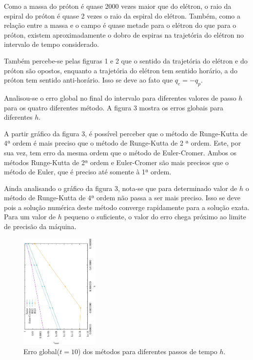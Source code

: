 \documentclass[brazilian, 12pt, a4paper, final]{article}
\begin{document}
\begin{multicols*}{2}
Como a massa do próton é quase 2000 vezes maior que do elétron, o raio da espiral do próton é quase 2 vezes o raio da espiral do elétron. Também, como a relação entre a massa e o campo é quase metade para o elétron do que para o próton, existem aproximadamente o dobro de espiras na trajetória do elétron no intervalo de tempo considerado.

Também percebe-se pelas figuras 1 e 2 que o sentido da trajetória do elétron e do próton são opostos, enquanto a trajetória do elétron tem sentido horário, a do próton tem sentido anti-horário. Isso se deve ao fato que $q_e=-q_p$.

Analisou-se o erro global no final do intervalo para diferentes valores de passo $h$ para os quatro diferentes método. A figura 3 mostra os erros globais para diferentes $h$.

A partir gráfico da figura 3, é possível perceber que o método de Runge-Kutta de 4ª ordem é mais preciso que o método de Runge-Kutta de 2 ª ordem. Este, por sua vez, tem erro da mesma ordem que o método de Euler-Cromer. Ambos os métodos Runge-Kutta de 2ª ordem e Euler-Cromer são mais precisos que o método de Euler, que é preciso até somente à 1ª ordem. 

Ainda analisando o gráfico da figura 3, nota-se que para determinado valor de $h$ o método de Runge-Kutta de 4ª ordem não passa a ser mais preciso. Isso se deve pois a solução numérica deste método converge rapidamente para a solução exata. Para um valor de $h$ pequeno o suficiente, o valor do erro chega próximo ao limite de precisão da máquina.

\begin{figure}[H]
  \centering
 \includegraphics[width=0.35\textwidth,angle=-90]{figuras/h_error.eps}
  \caption{Erro global($t=10$) dos métodos para diferentes passos de tempo $h$.}
\end{figure}


\end{multicols*}
\end{document}
